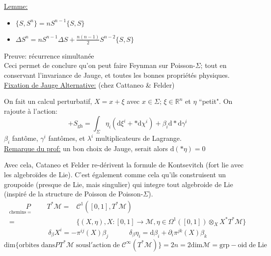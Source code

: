 \documentclass[a4paper,11pt]{article}
\renewcommand{\d}{{\mathrm{d}}}
\newcommand{\e}{{\mathrm{e}}}
\begin{document}
\noindent\underline{Lemme:}
\begin{itemize}
\item $\{S,S^n\} = n S^{n-1} \{S,S\}$
\item $\Delta S^n = n S^{n-1} \Delta S + \frac{n(n-1)}2 S^{n-2}\{S,S\}$
\end{itemize}
Preuve: récurrence simultanée\\

Ceci permet de conclure qu'on peut faire Feynman sur Poisson-$\Sigma$; tout en conservant l'invariance de Jauge, et toutes les bonnes propriétés physiques.\\

\noindent\underline{Fixation de Jauge Alternative:} (chez Cattaneo \& Felder)

On fait un calcul perturbatif, $X=x+\xi$ avec $x\in\Sigma$; $\xi \in \mathbb{R}^n$ et $\eta$ ``petit". On rajoute à l'action:
$$+ S_\mathrm{gh} = \int_\Sigma \eta_i (\d\xi^i + * \d \chi^i) + \beta_i \d * \d \gamma^i$$
$\beta_i$ fantôme, $\gamma^i$ fantômes, et $\lambda^i$ multiplicateurs de Lagrange.\\
\underline{Remarque du prof:} un bon choix de Jauge, serait alors $\d(*\eta)=0$

Avec cela, Cataneo et Felder re-dérivent la formule de Kontsevitch (fort lie avec les algebroïdes de Lie). C'est également comme cela qu'ils construisent un groupoide (presque de Lie, mais singulier) qui integre tout algebroide de Lie (inspiré de la structure de Poisson de Poisson-$\Sigma$). 
\begin{align*}\underset{\mathrm{chemins}=\quad\quad\quad}P\!\!\!\!\!\!\!\!\!\!\!\!\!\!\!\!T^*\mathcal{M} =& \mathcal{C}^1([0,1], T^*\mathcal M)\\
=& \{(X,\eta), X:[0,1] \to \mathcal{M}, \eta\in\Omega^1([0,1])\otimes_X X^*T^*\mathcal{M}\}
\end{align*}
$$\delta_\beta X^i = -\pi^{ij}(X)\beta_j\quad\quad\quad \delta_\beta \eta_i = \d \beta_i + \partial_i \pi^{jk}(X) \beta_k$$
$$\mathrm{dim}\{\mathrm{orbites}\;\mathrm{dans} PT^*\mathcal{M}\;\mathrm{sous} \mathrm{l}'\mathrm{action}\;\d\e\;\mathcal{C}^\infty(T^*\mathcal{M})\}=2n=2\mathrm{dim}\mathcal{M}=\mathrm{grp}-\mathrm{oid}\;\d\e\;\mathrm{Lie}$$
\end{document}
